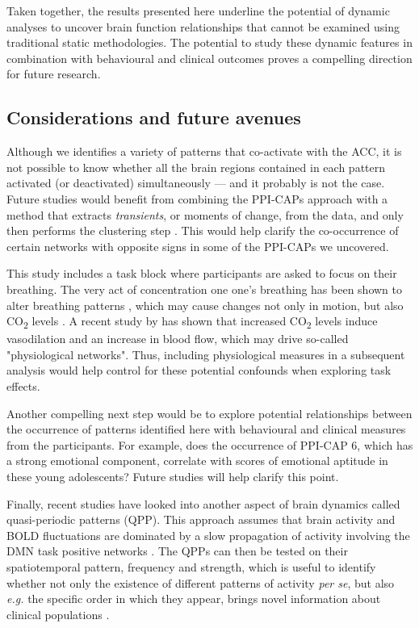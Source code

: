 Taken  together, the results presented here underline the potential of dynamic analyses to uncover brain function relationships that cannot be examined using traditional static methodologies. The potential to study these dynamic features in combination with behavioural and clinical outcomes proves a compelling direction for future research. 






\subsection*{Considerations and future avenues}

Although we identifies a variety of patterns that co-activate with the ACC, it is not possible to know whether all the brain regions contained in each pattern activated (or deactivated) simultaneously --- and it probably is not the case. Future studies would benefit from combining the PPI-CAPs approach with a method that extracts \textit{transients}, or moments of change, from the data, and only then performs the clustering step \citep{Karahanoglu2015a,Freitas2020}. This would help clarify the co-occurrence of certain networks with opposite signs in some of the PPI-CAPs we uncovered. 

This study includes a task block where participants are asked to focus on their breathing. The very act of concentration one one's breathing has been shown to alter breathing patterns \citep{Conrad2007}, which may cause changes not only in motion, but also CO\textsubscript{2} levels \citep{Western1988}. A recent study by \citet{Chen2020} has shown that increased CO\textsubscript{2} levels induce vasodilation and an increase in blood flow, which may drive so-called "physiological networks". Thus, including physiological measures in a subsequent analysis would help control for these potential confounds when exploring task effects.


Another compelling next step would be to explore potential relationships between the occurrence of patterns identified here with behavioural and clinical measures from the participants. For example, does the occurrence of PPI-CAP 6, which has a strong emotional component, correlate with scores of emotional aptitude in these young adolescents? Future studies will help clarify this point.

Finally, recent studies have looked into another aspect of brain dynamics called quasi-periodic patterns (QPP)\citep{Majeed2011}. This approach assumes that brain activity and BOLD fluctuations are dominated by a slow propagation of activity involving the DMN task positive networks \citep{Abbas2019}. The QPPs can then be tested on their spatiotemporal pattern, frequency and strength, which is useful to identify whether not only the existence of different patterns of activity \textit{per se}, but also \textit{e.g.} the specific order in which they appear, brings novel information about clinical populations \citep{Briend2020}.


